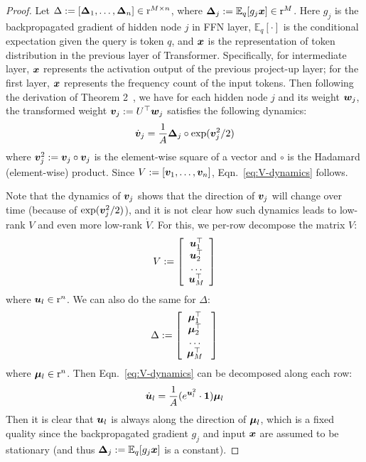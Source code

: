 \begin{proof}
Let $\Delta := [\boldsymbol{\Delta}_1, \ldots, \boldsymbol{\Delta}_n] \in {\textnormal{r}}^{M \times n}$, where $\boldsymbol{\Delta}_j := \mathbb{E}_{q}[g_j {\bm{x}}] \in {\textnormal{r}}^{M}$. Here $g_j$ is the backpropagated gradient of hidden node $j$ in FFN layer, $\mathbb{E}_q[\cdot]$ is the conditional expectation given the query is token $q$, and ${\bm{x}}$ is the representation of token distribution in the previous layer of Transformer. Specifically, for intermediate layer, ${\bm{x}}$ represents the activation output of the previous project-up layer; for the first layer, ${\bm{x}}$ represents the frequency count of the input tokens. Then following the derivation of Theorem 2~\cite{tian2023joma}, we have for each hidden node $j$ and its weight ${\bm{w}}_j$, the transformed weight ${\bm{v}}_j := U^\top {\bm{w}}_j$ satisfies the following dynamics: 
\begin{equation}
    \dot {{\bm{v}}}_j = \frac{1}{A} \boldsymbol{\Delta}_j \circ \exp({\bm{v}}_j ^2 / 2)  
\end{equation}
where ${\bm{v}}^2_j := {\bm{v}}_j \circ {\bm{v}}_j$ is the element-wise square of a vector and $\circ$ is the Hadamard (element-wise) product. Since $V := [{\bm{v}}_1, \ldots, {\bm{v}}_n]$, Eqn.~\ref{eq:V-dynamics} follows. 

Note that the dynamics of ${\bm{v}}_j$ shows that the direction of ${\bm{v}}_j$ will change over time (because of $\exp({\bm{v}}_j^2/2)$), and it is not clear how such dynamics leads to low-rank $V$ and even more low-rank $\dot V$. For this, we per-row decompose the matrix $V$:
\begin{equation}
    V := \left[\begin{array}{c}
       {\bm{u}}_1^\top \\
       {\bm{u}}_2^\top \\
       \ldots \\
       {\bm{u}}_M^\top 
    \end{array}\right]
\end{equation}
where ${\bm{u}}_l \in {\textnormal{r}}^n$. We can also do the same for $\Delta$:
\begin{equation}
    \Delta := \left[
    \begin{array}{c}
       {\bm{\mu}}_1^\top \\
       {\bm{\mu}}_2^\top \\
       \ldots \\
       {\bm{\mu}}_M^\top 
    \end{array}\
    \right] 
\end{equation}
where ${\bm{\mu}}_l \in {\textnormal{r}}^n$. Then Eqn.~\ref{eq:V-dynamics} can be decomposed along each row:
\begin{equation}
    \dot {{\bm{u}}}_l = \frac{1}{A} (e^{{\bm{u}}^2_l} \cdot {\bm{1}}){\bm{\mu}}_l
\end{equation}
Then it is clear that ${\bm{u}}_l$ is always along the direction of ${\bm{\mu}}_l$, which is a fixed quality since the backpropagated gradient $g_j$ and input ${\bm{x}}$ are assumed to be stationary (and thus  $\boldsymbol{\Delta}_j := \mathbb{E}_q[g_j{\bm{x}}]$ is a constant). 


\end{proof}
